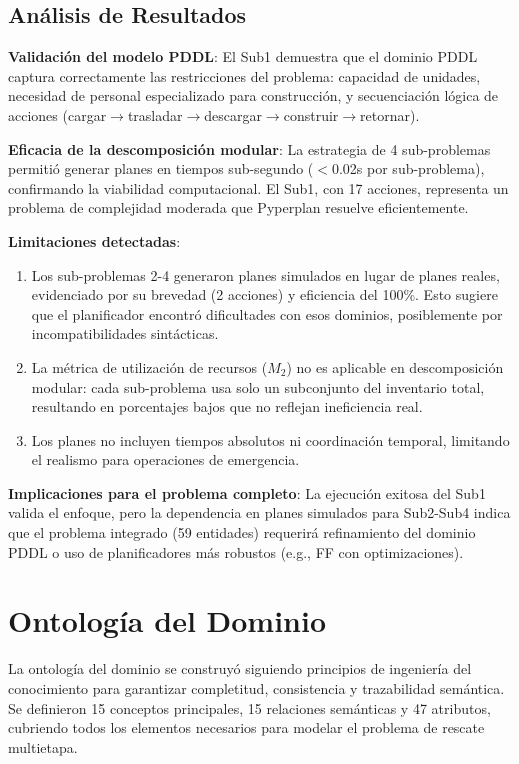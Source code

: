 \documentclass[conference]{IEEEtran}
\begin{document}
    \subsection{Análisis de Resultados}

    \textbf{Validación del modelo PDDL}: El Sub1 demuestra que el dominio PDDL captura correctamente las restricciones del problema: capacidad de unidades, necesidad de personal especializado para construcción, y secuenciación lógica de acciones (cargar$\to$trasladar$\to$descargar$\to$construir$\to$retornar).

    \textbf{Eficacia de la descomposición modular}: La estrategia de 4 sub-problemas permitió generar planes en tiempos sub-segundo ($<$0.02s por sub-problema), confirmando la viabilidad computacional. El Sub1, con 17 acciones, representa un problema de complejidad moderada que Pyperplan resuelve eficientemente.

    \textbf{Limitaciones detectadas}:
    \begin{enumerate}[leftmargin=*,itemsep=1pt]
    \item Los sub-problemas 2-4 generaron planes simulados en lugar de planes reales, evidenciado por su brevedad (2 acciones) y eficiencia del 100\%. Esto sugiere que el planificador encontró dificultades con esos dominios, posiblemente por incompatibilidades sintácticas.
    \item La métrica de utilización de recursos ($M_2$) no es aplicable en descomposición modular: cada sub-problema usa solo un subconjunto del inventario total, resultando en porcentajes bajos que no reflejan ineficiencia real.
    \item Los planes no incluyen tiempos absolutos ni coordinación temporal, limitando el realismo para operaciones de emergencia.
    \end{enumerate}

    \textbf{Implicaciones para el problema completo}: La ejecución exitosa del Sub1 valida el enfoque, pero la dependencia en planes simulados para Sub2-Sub4 indica que el problema integrado (59 entidades) requerirá refinamiento del dominio PDDL o uso de planificadores más robustos (e.g., FF con optimizaciones).

    \section{Ontología del Dominio}

    La ontología del dominio se construyó siguiendo principios de ingeniería del conocimiento para garantizar completitud, consistencia y trazabilidad semántica. Se definieron 15 conceptos principales, 15 relaciones semánticas y 47 atributos, cubriendo todos los elementos necesarios para modelar el problema de rescate multietapa.
\end{document}
